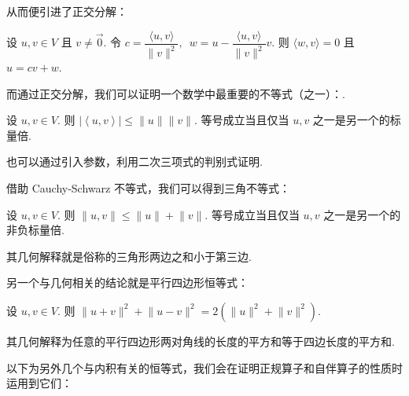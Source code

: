 从而便引进了正交分解：

\begin{theorem}
    设 $u, v \in V$ 且 $v \neq \vec{0}$. 令 $ c = \dfrac{\langle u, v\rangle}{\lVert v \rVert^2},
    \enspace w = u - \dfrac{\langle u, v\rangle}{\lVert v \rVert^2}v$. 则 $\langle w, v\rangle = 0$
    且 $u = cv + w$.
\end{theorem}

而通过正交分解，我们可以证明一个数学中最重要的不等式（之一）：.

\begin{theorem}
    设 $u, v \in V$. 则 $\left\lvert \left\langle u, v\right\rangle \right\rvert \leqslant \lVert u \rVert\lVert v \rVert$.
    等号成立当且仅当 $u, v$ 之一是另一个的标量倍.
\end{theorem}

也可以通过引入参数，利用二次三项式的判别式证明.

借助 Cauchy-Schwarz 不等式，我们可以得到三角不等式：

\begin{theorem}
    设 $u, v \in V$. 则 $\lVert u, v \rVert \leqslant \lVert u \rVert + \lVert v \rVert$.
    等号成立当且仅当 $u, v$ 之一是另一个的非负标量倍.
\end{theorem}

其几何解释就是俗称的三角形两边之和小于第三边.

另一个与几何相关的结论就是平行四边形恒等式：

\begin{theorem}
    设 $u, v \in V$. 则 $ \lVert u + v \rVert^{2} + \lVert u - v \rVert^{2} = 2(\lVert u \rVert^{2} + \lVert v \rVert^{2})$.
\end{theorem}

其几何解释为任意的平行四边形两对角线的长度的平方和等于四边长度的平方和.

\vspace{2ex}

以下为另外几个与内积有关的恒等式，我们会在证明正规算子和自伴算子的性质时运用到它们：

